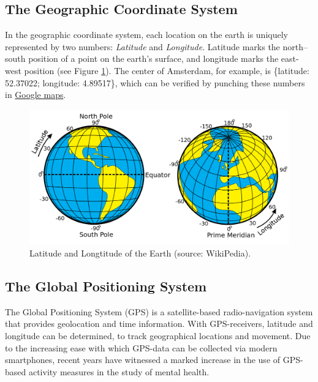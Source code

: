 \documentclass[]{book}
\begin{document}

\subsection{The Geographic Coordinate
System}\label{the-geographic-coordinate-system}

  

In the geographic coordinate system, each location on the earth is
uniquely represented by two numbers: \emph{Latitude} and
\emph{Longitude}. Latitude marks the north--south position of a point on
the earth's surface, and longitude marks the east-west position (see
Figure \ref{fig:longlat}). The center of Amsterdam, for example, is
\{latitude: 52.37022; longitude: 4.89517\}, which can be verified by
punching these numbers in \href{https://tinyurl.com/ybxxk99a}{Google
maps}.

\begin{figure}[!h]

{\centering \includegraphics[width=0.75\linewidth]{images/activity/Latitude_and_Longitude_of_the_Earth} 

}

\caption{Latitude and Longtitude of the Earth (source: WikiPedia).}\label{fig:longlat}
\end{figure}

\subsection{The Global Positioning
System}\label{the-global-positioning-system}


The Global Positioning System (GPS) is a satellite-based
radio-navigation system that provides geolocation and time information.
With GPS-receivers, latitude and longitude can be determined, to track
geographical locations and movement. Due to the increasing ease with
which GPS-data can be collected via modern smartphones, recent years
have witnessed a marked increase in the use of GPS-based activity
measures in the study of mental health.
\end{document}
